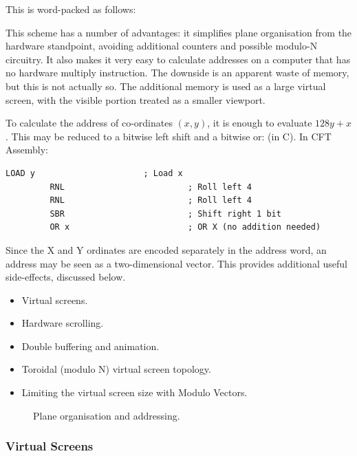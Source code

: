 \noindent This is word-packed as follows:

\begin{cbitfield}
\end{cbitfield}

\noindent This scheme has a number of advantages: it simplifies plane
organisation from the hardware standpoint, avoiding additional counters and
possible modulo-N circuitry. It also makes it very easy to calculate addresses
on a computer that has no hardware multiply instruction. The downside is an
apparent waste of memory, but this is not actually so. The additional memory is
used as a large virtual screen, with the visible portion treated as a smaller
viewport.

To calculate the address of co-ordinates $(x,y)$, it is enough to evaluate
$128y+x$. This may be reduced to a bitwise left shift and a bitwise or:
 (in C). In CFT Assembly:

\begin{lstlisting}[language=cftasm]
         LOAD y                      ; Load x
         RNL                         ; Roll left 4
         RNL                         ; Roll left 4
         SBR                         ; Shift right 1 bit
         OR x                        ; OR X (no addition needed)
\end{lstlisting}

\noindent Since the X and Y ordinates are encoded separately in the address word, an
address may be seen as a two-dimensional vector. This provides additional
useful side-effects, discussed below.

\begin{itemize}
\item Virtual screens.
\item Hardware scrolling.
\item Double buffering and animation.
\item Toroidal (modulo N) virtual screen topology.
\item Limiting the virtual screen size with Modulo Vectors. 
\end{itemize}

\begin{figure}
 \centering
 
 \caption[Plane Organisation]{\label{fig:plane-org} Plane organisation and
   addressing.}
\end{figure}


\subsubsection{Virtual Screens}

